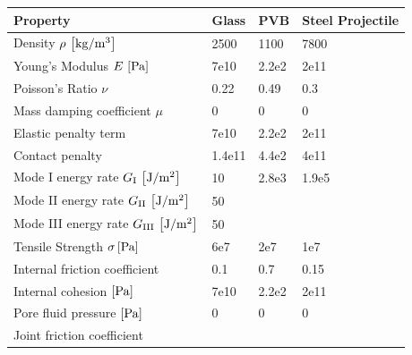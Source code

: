 \documentclass[12pt,twoside]{article}
\theoremstyle{break}
\begin{document}
\begin{table}[!htbp]
  \begin{tabular}{llll}
    Property                                                & Glass             & PVB                   & Steel Projectile  \\\midrule            
    Density $\rho\,\left[{\rm{kg}} / {\rm{m}}^3\right]$     & 2500 \cite{Xu10}  & 1100 \cite{Xu10}      & 7800 \cite{Che18} \\
    Young's Modulus $E\,\left[{\rm{Pa}}\right]$             & 7e10 \cite{Xu10}  & 2.2e2 \cite{Ved17}    & 2e11 \cite{Che18} \\
    Poisson's Ratio $\nu$                                   & 0.22 \cite{Xu10}  & 0.49 \cite{Che15}     & 0.3 \cite{Che18}  \\
    Mass damping coefficient $\mu$                          & 0                 & 0                     & 0                 \\
    Elastic penalty term                                    & 7e10              & 2.2e2                 & 2e11              \\
    Contact penalty                                         & 1.4e11            & 4.4e2                 & 4e11              \\
    Mode I energy rate $G_{\rm{I}}\,\left[{\rm{J}}/{\rm{m}}^2\right]$     & 10 \cite{Xu10}    &  2.8e3 \cite{Hoo17}    & 1.9e5 \cite{Sta00}\\
    Mode II energy rate $G_{\rm{II}}\,\left[{\rm{J}}/{\rm{m}}^2\right]$   & 50 \cite{Xu10}    &                       &     \\
    Mode III energy rate $G_{\rm{III}}\,\left[{\rm{J}}/{\rm{m}}^2\right]$ & 50 \cite{Xu10}    &                       &     \\
    Tensile Strength $\sigma \left[{\rm{Pa}}\right]$        & 6e7 \cite{Che15}  & 2e7 \cite{Zan12}      & 1e7 \cite{Wu14}   \\
    Internal friction coefficient                           & 0.1 \cite{Che15}  & 0.7 \cite{Kun15}      & 0.15 \cite{Sah07} \\
    Internal cohesion $\left[{\rm{Pa}}\right]$              & 7e10              & 2.2e2                 & 2e11              \\
    Pore fluid pressure $\left[{\rm{Pa}}\right]$            & 0                 & 0                     & 0                 \\
    Joint friction coefficient                              &                   &                       &                   \\

\end{tabular}
\end{table}
\end{document}

